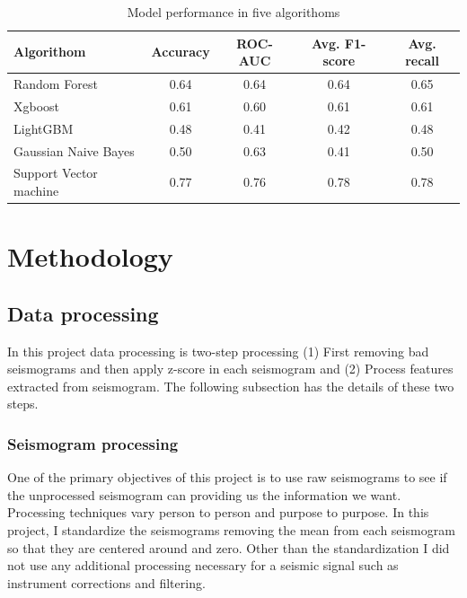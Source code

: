 \documentclass[12pt]{article}
\begin{document}
        \begin{table}[!ht]
            \caption{Model performance in five algorithoms}
            \vspace{0.5em}
            \label{tab:model_benchmark}
            \centering
            \begin{tabular}{l c c c c}
                \hline
                Algorithom & Accuracy & ROC-AUC & Avg. F1-score & Avg. recall \\
                \hline
                Random Forest & 0.64 & 0.64 & 0.64 & 0.65 \\
                Xgboost & 0.61 & 0.60 & 0.61 & 0.61 \\
                LightGBM & 0.48 & 0.41 & 0.42 & 0.48 \\
                Gaussian Naive Bayes & 0.50 & 0.63 & 0.41 & 0.50 \\
                Support Vector machine & 0.77 & 0.76 & 0.78 & 0.78 \\
                \hline
            \end{tabular}
        \end{table}
        
        \section{Methodology}
        \subsection{Data processing}
        In this project data processing is two-step processing (1) First removing bad seismograms and then apply z-score in each seismogram and (2) Process features extracted from seismogram. The following subsection has the details of these two steps.
        
        \subsubsection{Seismogram processing}
    
        One of the primary objectives of this project is to use raw seismograms to see if the unprocessed seismogram can providing us the information we want. Processing techniques vary person to person and purpose to purpose. In this project, I standardize the seismograms removing the mean from each seismogram so that they are centered around and zero. Other than the standardization I did not use any additional processing necessary for a seismic signal such as instrument corrections and filtering.
    
\end{document}
